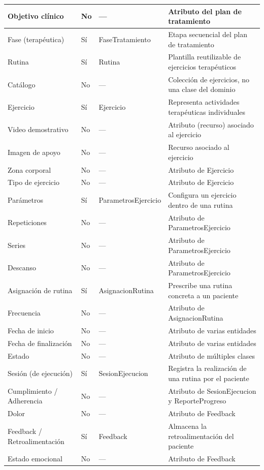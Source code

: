 \documentclass[11pt,letterpaper,oneside]{report}
\begin{document}
\begin{longtable}{|L{3.5cm}|C{2.0cm}|L{3.3cm}|L{5.4cm}|}
Objetivo clínico & No & --- & Atributo del plan de tratamiento \\ \hline
Fase (terapéutica) & Sí & FaseTratamiento & Etapa secuencial del plan de tratamiento \\ \hline
Rutina & Sí & Rutina & Plantilla reutilizable de ejercicios terapéuticos \\ \hline
Catálogo & No & --- & Colección de ejercicios, no una clase del dominio \\ \hline
Ejercicio & Sí & Ejercicio & Representa actividades terapéuticas individuales \\ \hline
Video demostrativo & No & --- & Atributo (recurso) asociado al ejercicio \\ \hline
Imagen de apoyo & No & --- & Recurso asociado al ejercicio \\ \hline
Zona corporal & No & --- & Atributo de Ejercicio \\ \hline
Tipo de ejercicio & No & --- & Atributo de Ejercicio \\ \hline
Parámetros & Sí & ParametrosEjercicio & Configura un ejercicio dentro de una rutina \\ \hline
Repeticiones & No & --- & Atributo de ParametrosEjercicio \\ \hline
Series & No & --- & Atributo de ParametrosEjercicio \\ \hline
Descanso & No & --- & Atributo de ParametrosEjercicio \\ \hline
Asignación de rutina & Sí & AsignacionRutina & Prescribe una rutina concreta a un paciente \\ \hline
Frecuencia & No & --- & Atributo de AsignacionRutina \\ \hline
Fecha de inicio & No & --- & Atributo de varias entidades \\ \hline
Fecha de finalización & No & --- & Atributo de varias entidades \\ \hline
Estado & No & --- & Atributo de múltiples clases \\ \hline
Sesión (de ejecución) & Sí & SesionEjecucion & Registra la realización de una rutina por el paciente \\ \hline
Cumplimiento / Adherencia & No & --- & Atributo de SesionEjecucion y ReporteProgreso \\ \hline
Dolor & No & --- & Atributo de Feedback \\ \hline
Feedback / Retroalimentación & Sí & Feedback & Almacena la retroalimentación del paciente \\ \hline
Estado emocional & No & --- & Atributo de Feedback \\ \hline

\end{longtable}
\end{document}
